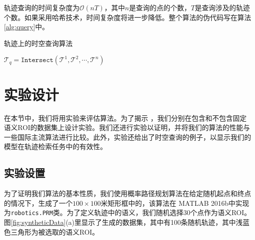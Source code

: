 轨迹查询的时间复杂度为$\mathcal{O}(nT)$，其中$n$是查询的点的个数，$T$是查询涉及的轨迹个数。如果采用哈希技术，时间复杂度将进一步降低。整个算法的伪代码写在算法\ref{alg:query}中。


\begin{algorithm}[!t]
\caption{轨迹上的时空查询算法}
\label{alg:query}
\small{
\BlankLine
{}
$\mathcal{T}_q = \texttt{Intersect}(\mathcal{T}^1, \mathcal{T}^2, \cdots, \mathcal{T}^n)$\;
}
\end{algorithm}

\section{实验设计}
在本节中，我们将用实验来评估算法。为了揭示 ，我们分别在包含和不包含固定语义ROI的数据集上设计实验。我们还进行实验以证明，并将我们的算法的性能与一些国际主流算法进行比较。此外，实验还给出了时空查询的例子，以显示我们的模型在轨迹检索任务中的有效性。

\subsection{实验设置}
为了证明我们算法的基本性质，我们使用概率路径规划算法在给定随机起点和终点的情况下，生成了一个$100\times100$米矩形框中的，该算法在 MATLAB 2016b中实现为\texttt{robotics.PRM}类。为了定义轨迹中的语义，我们随机选择30个点作为语义ROI。 图\ref{fig:syntheticData}(a)里显示了生成的数据集，其中有100条随机轨迹，其中浅蓝色三角形为被选取的语义ROI。


